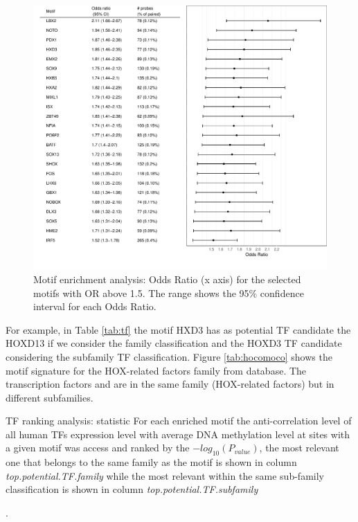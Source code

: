 \begin{center}
\begin{figure}[h!]
\includegraphics[width=16cm]{images/hyper_motif_enrichment.pdf}
\caption{Motif enrichment analysis: Odds Ratio (x axis) for the selected motifs with OR above 1.5. The range shows the 95\% confidence interval for each Odds Ratio.}
\end{figure}
\label{tab:or}
\end{center}


For example, in Table \ref{tab:tf} the motif HXD3 has as potential TF candidate the HOXD13 if we consider the family  classification and the HOXD3 TF candidate considering the subfamily TF classification. Figure \ref{tab:hocomoco} shows the motif signature for the HOX-related factors family from  database. The transcription factors  and  are in the same family (HOX-related factors) but in different subfamilies.



\begin{table}[h!]
\centering
\caption{TF ranking analysis: statistic For each enriched motif the anti-correlation level of all human TFs expression level with average DNA methylation level at sites with a given motif was access and ranked by the $-log_{10}(P_{value})$, the most relevant one that belongs to the same family as the motif is shown in column \textit{top.potential.TF.family} while the most relevant within the same sub-family classification is shown in column \textit{top.potential.TF.subfamily}}.
\label{tab:tf}
\end{table}

